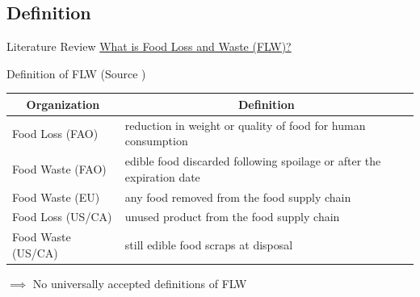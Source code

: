 \documentclass{beamer}
\begin{document}
\subsection{Definition}
\begin{frame}{Literature Review}
    \underline{What is Food Loss and Waste (FLW)?}
    \begin{block}{Definition of FLW (Source \cite{Ishangulyyev2019-uu})}
        \begin{table}[h]
            \begin{tabularx}{\textwidth}{l|X}
            \multicolumn{1}{c}{Organization} & \multicolumn{1}{c}{Definition} \\ \hline
                \small Food Loss (FAO)     
                & \footnotesize reduction in weight or quality of food for human consumption \\
                \small Food Waste (FAO)    
                & \footnotesize edible food discarded following spoilage or after the expiration date\\ \hline
                \small Food Waste (EU)     
                & \footnotesize any food removed from the food supply chain    \\ \hline
                \small Food Loss (US/CA)   
                & \footnotesize unused product from the food supply chain \\
                \small Food Waste (US/CA)  
                & \footnotesize still edible food scraps at disposal\\ \hline
            \end{tabularx}
        \end{table}
    \end{block}
    $\implies$ No universally accepted definitions of FLW
\end{frame}
\end{document}
